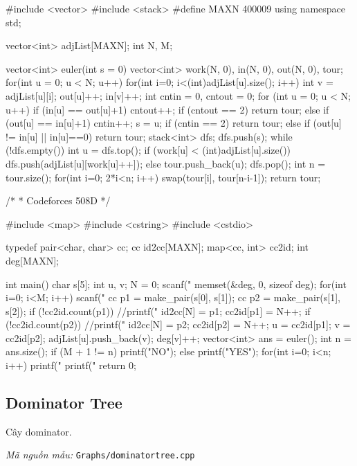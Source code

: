 \documentclass[11pt]{article}
\newcommand{\codepath}[1]{\par\noindent\textit{Mã nguồn mẫu:} \texttt{#1}\par}
\begin{document}
\begingroup\scriptsize
\begin{vncode}
#include <vector>
#include <stack>
#define MAXN 400009
using namespace std;

vector<int> adjList[MAXN];
int N, M;

vector<int> euler(int s = 0) {
	vector<int> work(N, 0), in(N, 0), out(N, 0), tour;
	for(int u = 0; u < N; u++) {
		for(int i=0; i<(int)adjList[u].size(); i++) {
			int v = adjList[u][i];
			out[u]++; in[v]++;
		}
	}
	int cntin = 0, cntout = 0;
	for (int u = 0; u < N; u++) {
		if (in[u] == out[u]+1) {
			cntout++;
			if (cntout == 2) return tour;
		}
		else if (out[u] == in[u]+1) {
			cntin++; s = u;
			if (cntin == 2) return tour;
		}
		else if (out[u] != in[u] || in[u]==0) return tour;
	}
	stack<int> dfs;
	dfs.push(s);
	while (!dfs.empty()) {
		int u = dfs.top();
		if (work[u] < (int)adjList[u].size()) {
			dfs.push(adjList[u][work[u]++]);
		}
		else {
			tour.push_back(u);
			dfs.pop();
		}
	}
	int n = tour.size();
	for(int i=0; 2*i<n; i++) swap(tour[i], tour[n-i-1]);
	return tour;
}

/*
 * Codeforces 508D
 */

#include <map>
#include <cstring>
#include <cstdio>

typedef pair<char, char> cc;
cc id2cc[MAXN];
map<cc, int> cc2id;
int deg[MAXN];

int main()
{
	char s[5];
	int u, v;
	N = 0;
	scanf("%
	memset(&deg, 0, sizeof deg);
	for(int i=0; i<M; i++) {
		scanf(" %
		cc p1 = make_pair(s[0], s[1]);
		cc p2 = make_pair(s[1], s[2]);
		if (!cc2id.count(p1)) {
			//printf("%
			id2cc[N] = p1;
			cc2id[p1] = N++;
		}
		if (!cc2id.count(p2)) {
			//printf("%
			id2cc[N] = p2;
			cc2id[p2] = N++;
		}
		u = cc2id[p1];
		v = cc2id[p2];
		adjList[u].push_back(v);
		deg[v]++;
	}
	vector<int> ans = euler();
	int n = ans.size();
	if (M + 1 != n) {
		printf("NO\n");
	}
	else {
		printf("YES\n");
		for(int i=0; i<n; i++) {
			printf("%
		}
		printf("%
	}
	return 0;
}
\end{vncode}
\endgroup


\subsection{Dominator Tree}

Cây dominator.

\codepath{Graphs/dominatortree.cpp}
\end{document}
